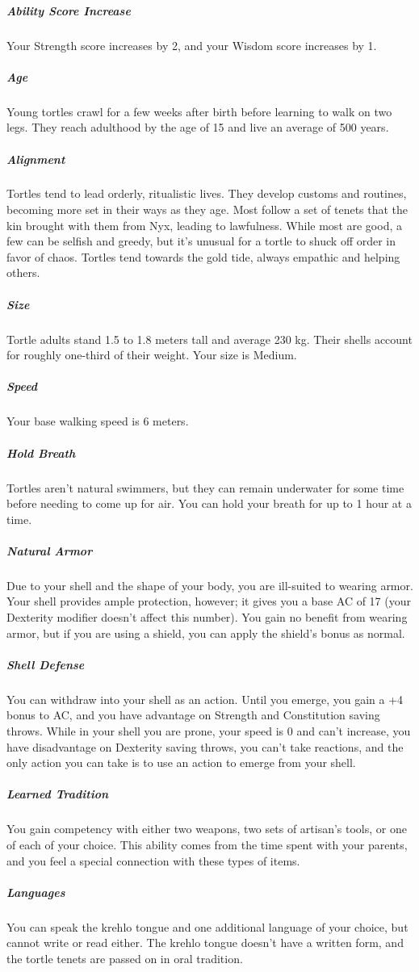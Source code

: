     \subparagraph{Ability Score Increase} Your Strength score increases by 2, and your Wisdom score increases by 1.

    \subparagraph{Age} Young tortles crawl for a few weeks after birth before learning to walk on two legs.
    They reach adulthood by the age of 15 and live an average of 500 years.

    \subparagraph{Alignment} Tortles tend to lead orderly, ritualistic lives.
    They develop customs and routines, becoming more set in their ways as they age.
    Most follow a set of tenets that the kin brought with them from Nyx, leading to lawfulness.
    While most are good, a few can be selfish and greedy, but it's unusual for a tortle to shuck off order in favor of chaos.
    Tortles tend towards the gold tide, always empathic and helping others.

    \subparagraph{Size} Tortle adults stand 1.5 to 1.8 meters tall and average 230 kg.
    Their shells account for roughly one-third of their weight.
    Your size is Medium.

    \subparagraph{Speed} Your base walking speed is 6 meters.

    \subparagraph{Hold Breath} Tortles aren't natural swimmers, but they can remain underwater for some time before needing to come up for air.
    You can hold your breath for up to 1 hour at a time.

    \subparagraph{Natural Armor} Due to your shell and the shape of your body, you are ill-suited to wearing armor.
    Your shell provides ample protection, however; it gives you a base AC of 17 (your Dexterity modifier doesn't affect this number).
    You gain no benefit from wearing armor, but if you are using a shield, you can apply the shield's bonus as normal.

    \subparagraph{Shell Defense} You can withdraw into your shell as an action.
    Until you emerge, you gain a +4 bonus to AC, and you have advantage on Strength and Constitution saving throws.
    While in your shell you are prone, your speed is 0 and can't increase, you have disadvantage on Dexterity saving throws, you can't take reactions, and the only action you can take is to use an action to emerge from your shell.


    \subparagraph{Learned Tradition} You gain competency with either two weapons, two sets of artisan's tools, or one of each of your choice.
    This ability comes from the time spent with your parents, and you feel a special connection with these types of items.

    \subparagraph{Languages} You can speak the krehlo tongue and one additional language of your choice, but cannot write or read either.
    The krehlo tongue doesn't have a written form, and the tortle tenets are passed on in oral tradition.

\newpage
